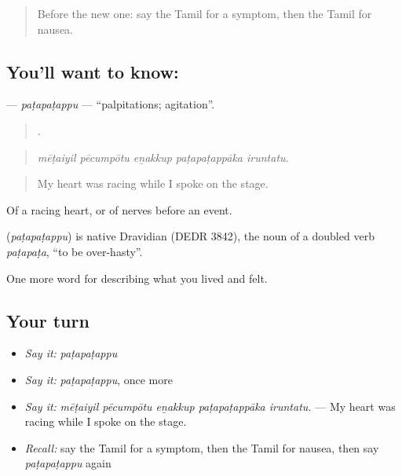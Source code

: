 \label{lesson:TA-C474-patapatappu}



\begin{quote}
Before the new one: say the Tamil for a symptom, then the Tamil for nausea.
\end{quote}

\subsection*{You'll want to know: }
\textbf{} — \emph{paṭapaṭappu} — \textquotedblleft{}palpitations; agitation\textquotedblright{}.

\begin{quote}
    .
\end{quote}

\begin{quote}
\emph{mēṭaiyil pēcumpōtu eṉakkup paṭapaṭappāka iruntatu.}
\end{quote}

\begin{quote}
My heart was racing while I spoke on the stage.
\end{quote}

Of a racing heart, or of nerves before an event.

\begin{cousinweb}
\textbf{} (\emph{paṭapaṭappu}) is native Dravidian (DEDR 3842), the noun of a doubled verb  \emph{paṭapaṭa}, \textquotedblleft{}to be over-hasty\textquotedblright{}.
\end{cousinweb}

\begin{grammarlens}[title={What you've built}]
One more word for describing what you lived and felt.
\end{grammarlens}

\subsection*{Your turn}
\begin{itemize}
\raggedright
  \item \emph{Say it:} \emph{paṭapaṭappu}
  \item \emph{Say it:} \emph{paṭapaṭappu}, once more
  \item \emph{Say it:} \emph{mēṭaiyil pēcumpōtu eṉakkup paṭapaṭappāka iruntatu.} — My heart was racing while I spoke on the stage.
  \item \emph{Recall:} say the Tamil for a symptom, then the Tamil for nausea, then say \emph{paṭapaṭappu} again
\end{itemize}

